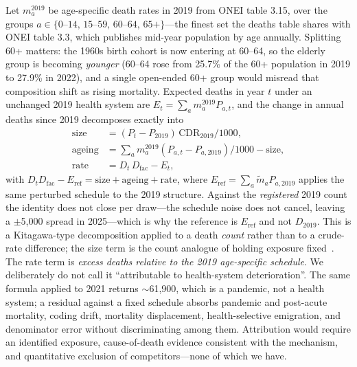\documentclass[11pt,a4paper]{article}
\begin{document}
Let $m^{2019}_a$ be age-specific death rates in 2019 from ONEI table 3.15, over the groups $a\in\{0\text{--}14,\,15\text{--}59,\,60\text{--}64,\,65+\}$---the finest set the deaths table shares with ONEI table 3.3, which publishes mid-year population by age annually.
Splitting 60+ matters: the 1960s birth cohort is now entering at 60--64, so the elderly group is becoming \emph{younger} (60--64 rose from 25.7\% of the 60+ population in 2019 to 27.9\% in 2022), and a single open-ended 60+ group would misread that composition shift as rising mortality.
Expected deaths in year $t$ under an unchanged 2019 health system are $E_t=\sum_a m^{2019}_a P_{a,t}$, and the change in annual deaths since 2019 decomposes exactly into
\begin{align}
\text{size} &= (P_t-P_{2019})\,\mathrm{CDR}_{2019}/1000, \\
\text{ageing} &= \textstyle\sum_a m^{2019}_a (P_{a,t}-P_{a,2019})/1000 - \text{size}, \\
\text{rate} &= D_t\,D_{\mathrm{fac}} - E_t,
\end{align}
with $D_t D_{\mathrm{fac}} - E_{\mathrm{ref}} = \text{size}+\text{ageing}+\text{rate}$, where $E_{\mathrm{ref}}=\sum_a \tilde m_a P_{a,2019}$ applies the same perturbed schedule to the 2019 structure. Against the \emph{registered} 2019 count the identity does not close per draw---the schedule noise does not cancel, leaving a $\pm$5{,}000 spread in 2025---which is why the reference is $E_{\mathrm{ref}}$ and not $D_{2019}$.
This is a Kitagawa-type decomposition applied to a death \emph{count} rather than to a crude-rate difference; the size term is the count analogue of holding exposure fixed~\citep{kitagawa1955}.
The rate term is \emph{excess deaths relative to the 2019 age-specific schedule}.
We deliberately do not call it ``attributable to health-system deterioration''.
The same formula applied to 2021 returns $\sim$61{,}900, which is a pandemic, not a health system; a residual against a fixed schedule absorbs pandemic and post-acute mortality, coding drift, mortality displacement, health-selective emigration, and denominator error without discriminating among them.
Attribution would require an identified exposure, cause-of-death evidence consistent with the mechanism, and quantitative exclusion of competitors---none of which we have.
\end{document}
